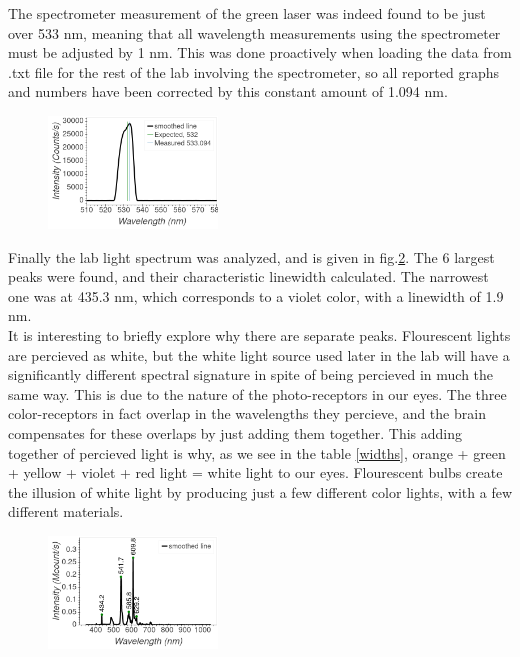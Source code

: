 \documentclass[aps,prl,reprint]{revtex4-2}
\begin{document}
The spectrometer measurement of the green laser was indeed found to be just over 533 nm,
meaning that all wavelength measurements using the spectrometer must be adjusted by 
1 nm. This was done proactively when loading the data from .txt file for the rest of the
lab involving the spectrometer, so all reported graphs and numbers have been corrected 
by this constant amount of 1.094 nm.

\begin{figure}[h]
\includegraphics[width=0.4\textwidth]{../Images/l3_A_green.png}
\caption{\label{green}}
\end{figure}

Finally the lab light spectrum was analyzed, and is given in fig.\ref{lablight}.
The 6 largest peaks were found, and their
characteristic linewidth calculated. The narrowest one was at 435.3 nm, which 
corresponds to a violet color, with a linewidth of 1.9 nm. \\

It is interesting to briefly explore why there are separate peaks. Flourescent lights
are percieved as white, but the white light source used later in the lab will have
a significantly different spectral signature in spite of being percieved in much
the same way. This is due to the nature of the photo-receptors in our eyes. The three
color-receptors in fact overlap in the wavelengths they percieve, and the brain 
compensates for these overlaps by just adding them together. This adding together of
percieved light is why, as we see in the table \ref{widths}, orange + green + yellow + 
violet + red light = white light to our eyes. Flourescent bulbs create the illusion
of white light by producing just a few different color lights, with a few different
materials. \\

\begin{figure}[h]
\includegraphics[width=0.4\textwidth]{../Images/l3_A_lablight.png}
\caption{\label{lablight}}
\end{figure}
\end{document}

